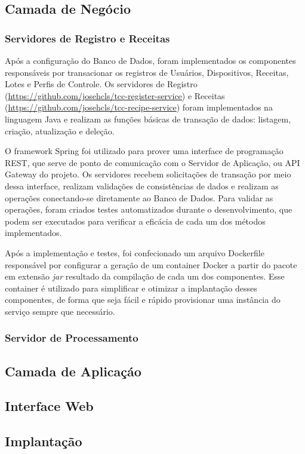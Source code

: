 \subsection{Camada de Negócio}


\subsubsection{Servidores de Registro e Receitas}


Após a configuração do Banco de Dados, foram implementados os componentes responsáveis por transacionar os registros de Usuários, Dispositivos, Receitas, Lotes e Perfis de Controle. 
Os servidores de Registro (\url{https://github.com/josehcls/tcc-register-service}) e Receitas (\url{https://github.com/josehcls/tcc-recipe-service}) foram implementados na linguagem Java e realizam as funções básicas de transação de dados: listagem, criação, atualização e deleção. 


O framework Spring foi utilizado para prover uma interface de programação REST, que serve de ponto de comunicação com o Servidor de Aplicação, ou API Gateway do projeto. Os servidores recebem solicitações de transação por meio dessa interface, realizam validações de consistências de dados e realizam as operações conectando-se diretamente ao Banco de Dados. Para validar as operações, foram criados testes automatizados durante o desenvolvimento, que podem ser executados para verificar a eficácia de cada um dos métodos implementados.


Após a implementação e testes, foi confecionado um arquivo Dockerfile responsável por configurar a geração de um container Docker a partir do pacote em extensão \textit{jar} resultado da compilação de cada um dos componentes.
Esse container é utilizado para simplificar e otimizar a implantação desses componentes, de forma que seja fácil e rápido provisionar uma instância do serviço sempre que necessário.


\subsubsection{Servidor de Processamento}


\subsection{Camada de Aplicaçáo} 

\subsection{Interface Web}

\subsection{Implantação}
